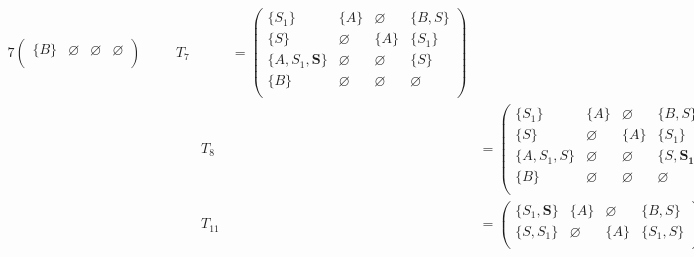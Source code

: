 \begin{figure}[ht]
\begin{alignat*}{7}
\begin{pmatrix}
\{B\}       & \varnothing & \varnothing & \varnothing \\
\end{pmatrix} \ \ \ \ &&T_7 &&= \begin{pmatrix}
\{S_1\}     & \{A\}       & \varnothing & \{B, S\}    \\
\{S\}       & \varnothing & \{A\}       & \{S_1\}     \\
\{A, S_1, \pmb{S}\}  & \varnothing & \varnothing & \{S\}    \\
\{B\}       & \varnothing & \varnothing & \varnothing \\
\end{pmatrix}  \\
& &&T_8 &&= \begin{pmatrix}
\{S_1\}     & \{A\}       & \varnothing & \{B, S\}    \\
\{S\}       & \varnothing & \{A\}       & \{S_1\}     \\
\{A, S_1, S\}  & \varnothing & \varnothing & \{S, \pmb{S_1}\} \\
\{B\}       & \varnothing & \varnothing & \varnothing \\
\end{pmatrix} \ \ \ \ &&T_9 &&= \begin{pmatrix}
\{S_1\}     & \{A\}       & \varnothing & \{B, S\}    \\
\{S\}       & \varnothing & \{A\}       & \{S_1, \pmb{S}\}     \\
\{A, S_1, S\}  & \varnothing & \varnothing & \{S, S_1\} \\
\{B\}       & \varnothing & \varnothing & \varnothing \\
\end{pmatrix} \ \ \ \ &&T_{10} &&= \begin{pmatrix}
\{S_1\}     & \{A\}       & \varnothing & \{B, S\}    \\
\{S, \pmb{S_1}\}       & \varnothing & \{A\}       & \{S_1, S\}     \\
\{A, S_1, S\}  & \varnothing & \varnothing & \{S, S_1\} \\
\{B\}       & \varnothing & \varnothing & \varnothing \\
\end{pmatrix}  \\
& &&T_{11} &&= \begin{pmatrix}
\{S_1, \pmb{S}\}     & \{A\}       & \varnothing & \{B, S\}    \\
\{S, S_1\}       & \varnothing & \{A\}       & \{S_1, S\}     \\

\end{pmatrix}
\end{alignat*}
\end{figure}
